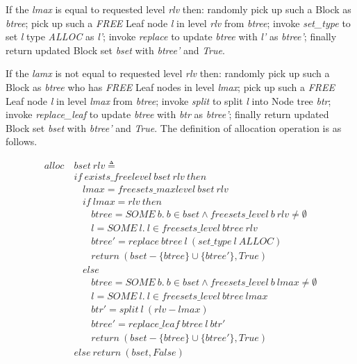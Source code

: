 If the \emph{lmax} is equal to requested level \emph{rlv} then: randomly pick up such a Block as \emph{btree}; pick up such a \emph{FREE} Leaf node \emph{l} in level \emph{rlv} from \emph{btree}; invoke \emph{set\_type} to set \emph{l} type \emph{ALLOC} as \emph{l'}; invoke \emph{replace} to update \emph{btree} with \emph{l'} as \emph{btree'}; finally return updated Block set \emph{bset} with \emph{btree'} and \emph{True}.

If the \emph{lamx} is not equal to requested level \emph{rlv} then: randomly pick up such a Block as \emph{btree} who has \emph{FREE} Leaf nodes in level \emph{lmax}; pick up such a \emph{FREE} Leaf node \emph{l} in level \emph{lmax} from \emph{btree}; invoke \emph{split} to split \emph{l} into Node tree \emph{btr}; invoke \emph{replace\_leaf} to update \emph{btree} with \emph{btr} as \emph{btree'}; finally return updated Block set \emph{bset} with \emph{btree'} and \emph{True}. The definition of allocation operation is as follows.

\begin{definition} 
\end{definition}
\vspace{-7pt}
{\footnotesize
\begin{align*}
alloc\ &bset\ rlv \triangleq \\
&if\ exists\_freelevel\ bset\ rlv\ then \\
&\ \ \ \ lmax = freesets\_maxlevel\ bset\ rlv \\
&\ \ \ \ if\ lmax = rlv\ then \\
&\ \ \ \ \ \ \ \ btree = SOME\ b.\ b \in bset \wedge freesets\_level\ b\ rlv \ne \emptyset \\
&\ \ \ \ \ \ \ \ l = SOME\ l.\ l \in freesets\_level\ btree\ rlv \\
&\ \ \ \ \ \ \ \ btree' = replace\ btree\ l\ (set\_type\ l\ ALLOC) \\
&\ \ \ \ \ \ \ \ return\ (bset - \lbrace btree \rbrace \cup \lbrace btree' \rbrace, True) \\
&\ \ \ \ else \\
&\ \ \ \ \ \ \ \ btree = SOME\ b.\ b \in bset \wedge freesets\_level\ b\ lmax \ne \emptyset \\
&\ \ \ \ \ \ \ \ l = SOME\ l.\ l \in freesets\_level\ btree\ lmax \\
&\ \ \ \ \ \ \ \ btr' = split\ l\ (rlv - lmax) \\
&\ \ \ \ \ \ \ \ btree' = replace\_leaf\ btree\ l\ btr' \\
&\ \ \ \ \ \ \ \ return\ (bset - \lbrace btree \rbrace \cup \lbrace btree' \rbrace, True) \\
&else\ return\ (bset, False)
\end{align*}
}
\vspace{-17pt}

